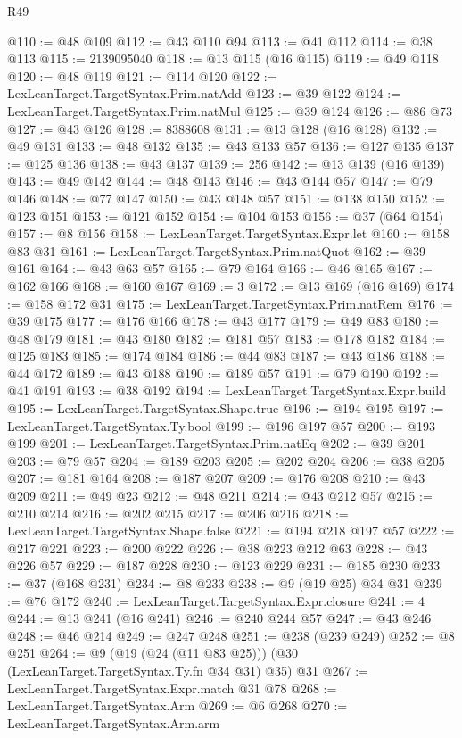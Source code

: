 \begin{lexlean}{R49}
\begin{coremodule}
@110 := @48 @109
@112 := @43 @110 @94
@113 := @41 @112
@114 := @38 @113
@115 := 2139095040
@118 := @13 @115 (@16 @115)
@119 := @49 @118
@120 := @48 @119
@121 := @114 @120
@122 := LexLeanTarget.TargetSyntax.Prim.natAdd
@123 := @39 @122
@124 := LexLeanTarget.TargetSyntax.Prim.natMul
@125 := @39 @124
@126 := @86 @73
@127 := @43 @126
@128 := 8388608
@131 := @13 @128 (@16 @128)
@132 := @49 @131
@133 := @48 @132
@135 := @43 @133 @57
@136 := @127 @135
@137 := @125 @136
@138 := @43 @137
@139 := 256
@142 := @13 @139 (@16 @139)
@143 := @49 @142
@144 := @48 @143
@146 := @43 @144 @57
@147 := @79 @146
@148 := @77 @147
@150 := @43 @148 @57
@151 := @138 @150
@152 := @123 @151
@153 := @121 @152
@154 := @104 @153
@156 := @37 (@64 @154)
@157 := @8 @156
@158 := LexLeanTarget.TargetSyntax.Expr.let
@160 := @158 @83 @31
@161 := LexLeanTarget.TargetSyntax.Prim.natQuot
@162 := @39 @161
@164 := @43 @63 @57
@165 := @79 @164
@166 := @46 @165
@167 := @162 @166
@168 := @160 @167
@169 := 3
@172 := @13 @169 (@16 @169)
@174 := @158 @172 @31
@175 := LexLeanTarget.TargetSyntax.Prim.natRem
@176 := @39 @175
@177 := @176 @166
@178 := @43 @177
@179 := @49 @83
@180 := @48 @179
@181 := @43 @180
@182 := @181 @57
@183 := @178 @182
@184 := @125 @183
@185 := @174 @184
@186 := @44 @83
@187 := @43 @186
@188 := @44 @172
@189 := @43 @188
@190 := @189 @57
@191 := @79 @190
@192 := @41 @191
@193 := @38 @192
@194 := LexLeanTarget.TargetSyntax.Expr.build
@195 := LexLeanTarget.TargetSyntax.Shape.true
@196 := @194 @195
@197 := LexLeanTarget.TargetSyntax.Ty.bool
@199 := @196 @197 @57
@200 := @193 @199
@201 := LexLeanTarget.TargetSyntax.Prim.natEq
@202 := @39 @201
@203 := @79 @57
@204 := @189 @203
@205 := @202 @204
@206 := @38 @205
@207 := @181 @164
@208 := @187 @207
@209 := @176 @208
@210 := @43 @209
@211 := @49 @23
@212 := @48 @211
@214 := @43 @212 @57
@215 := @210 @214
@216 := @202 @215
@217 := @206 @216
@218 := LexLeanTarget.TargetSyntax.Shape.false
@221 := @194 @218 @197 @57
@222 := @217 @221
@223 := @200 @222
@226 := @38 @223 @212 @63
@228 := @43 @226 @57
@229 := @187 @228
@230 := @123 @229
@231 := @185 @230
@233 := @37 (@168 @231)
@234 := @8 @233
@238 := @9 (@19 @25) @34 @31
@239 := @76 @172
@240 := LexLeanTarget.TargetSyntax.Expr.closure
@241 := 4
@244 := @13 @241 (@16 @241)
@246 := @240 @244 @57
@247 := @43 @246
@248 := @46 @214
@249 := @247 @248
@251 := @238 (@239 @249)
@252 := @8 @251
@264 := @9 (@19 (@24 (@11 @83 @25))) (@30 (LexLeanTarget.TargetSyntax.Ty.fn @34 @31) @35) @31
@267 := LexLeanTarget.TargetSyntax.Expr.match @31 @78
@268 := LexLeanTarget.TargetSyntax.Arm
@269 := @6 @268
@270 := LexLeanTarget.TargetSyntax.Arm.arm

\end{coremodule}
\end{lexlean}
